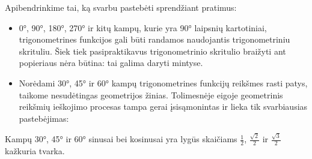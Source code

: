 \documentclass[a4paper]{article}
\begin{document}
Apibendrinkime tai, ką svarbu pastebėti sprendžiant pratimus: 
\begin{itemize}
\item 0°, 90°, 180°, 270° ir kitų kampų, kurie yra 90° laipsnių kartotiniai, trigonometrines funkcijos gali būti randamos naudojantis trigonometriniu skrituliu. Šiek tiek pasipraktikavus trigonometrinio skritulio braižyti ant popieriaus nėra būtina: tai galima daryti mintyse.
\item Norėdami 30°, 45° ir 60° kampų trigonometrines funkcijų reikšmes rasti patys, taikome nesudėtingas geometrijos žinias. Tolimesnėje eigoje geometrinis reikšmių ieškojimo procesas tampa gerai įsisąmonintas ir lieka tik svarbiausias pastebėjimas: 
\end{itemize}
\begin{mdframed}[backgroundcolor=yellow!50!white]
Kampų 30°, 45° ir 60° sinusai bei kosinusai yra lygūs skaičiams $\frac{1}{2}$, $\frac{\sqrt{2}}{2}$ ir $\frac{\sqrt{3}}{2}$ kažkuria tvarka.
\end{mdframed}
\end{document}

